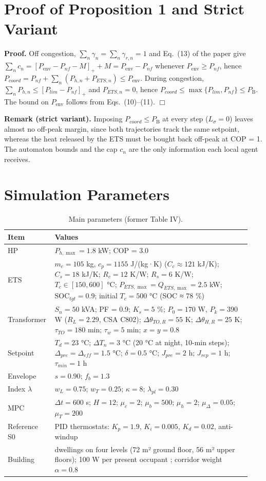 \documentclass[10pt,letterpaper]{article}
\newcommand{\Penv}{P_{\mathrm{env}}}
\newcommand{\PB}{P_{\mathrm{B}}}
\begin{document}
\section{Proof of Proposition 1 and Strict Variant}\label{s:proof}
\textbf{Proof.} Off congestion, $\sum_n\gamma_n=\sum_n\gamma_{r,n}=1$ and Eq.~(13) of the paper give
$\sum_nc_n=[\Penv-P_{nf}-M]_++M=\Penv-P_{nf}$ whenever $\Penv\ge P_{nf}$, hence $P_{coord}=P_{nf}+\sum_n(P_{h,n}+P_{ETS,n})\le\Penv$. During congestion, $\sum_nP_{h,n}\le[P_{lim}-P_{nf}]_+$ and $P_{ETS,n}=0$, hence $P_{coord}\le\max\{P_{lim},P_{nf}\}\le\PB$. The bound on $\Penv$ follows from Eqs.~(10)--(11). \hfill$\Box$

\textbf{Remark (strict variant).} Imposing $P_{coord}\le\PB$ at every step ($L_\sigma=0$) leaves almost no off-peak margin, since both trajectories track the same setpoint, whereas the heat released by the ETS must be bought back off-peak at COP = 1. The automaton bounds and the cap $c_n$ are the only information each local agent receives.

\section{Simulation Parameters}\label{s:param}
\begin{table}[h]
\centering\small
\caption{Main parameters (former Table IV).}\label{tab:s-param}
\begin{tabular}{>{\raggedright\arraybackslash}p{0.16\linewidth}>{\raggedright\arraybackslash}p{0.78\linewidth}}
\toprule
\textbf{Item} & \textbf{Values} \\
\midrule
HP & $P_{h,\max}=1.8$ kW; COP = 3.0 \\
ETS & $m_c=105$ kg, $c_p=1155$ J/(kg·K) ($C_c\approx121$ kJ/K); $C_s=18$ kJ/K; $R_c=12$ K/W; $R_s=6$ K/W; $T_c\in[150,600]$ °C; $P_{ETS,\max}=Q_{ETS,\max}=2.5$ kW; $\mathrm{SOC}_{tgt}=0.9$; initial $T_c=500$ °C (SOC ≈ 78 \%) \\
Transformer & $S_n=50$ kVA; PF = 0.9; $K_s=5$ \%; $P_0=170$ W, $P_k=390$ W ($R_L=2.29$, CSA C802); $\Delta\theta_{TO,R}=55$ K; $\Delta\theta_{H,R}=25$ K; $\tau_{TO}=180$ min; $\tau_w=5$ min; $x=y=0.8$ \\
Setpoint & $T_d=23$ °C; $\Delta T_n=3$ °C (20 °C at night, 10-min steps); $\Delta_{pre}=\Delta_{eff}=1.5$ °C; $\delta=0.5$ °C; $J_{pre}=2$ h; $J_{rep}=1$ h; $\tau_{min}=1$ h \\
Envelope & $s=0.90$; $f_b=1.3$ \\
Index $\lambda$ & $w_L=0.75$; $w_T=0.25$; $\kappa=8$; $\lambda_{pl}=0.30$ \\
MPC & $\Delta t=600$ s; $H=12$; $\mu_c=2$; $\mu_b=500$; $\mu_h=2$; $\mu_\Delta=0.05$; $\mu_T=200$ \\
Reference S0 & PID thermostats: $K_p=1.9$, $K_i=0.005$, $K_d=0.02$, anti-windup \\
Building & 16 dwellings on four levels (72 m² ground floor, 56 m² upper floors); 100 W per present occupant \cite{Richardson2008}; corridor weight $\alpha=0.8$ \\
\bottomrule
\end{tabular}
\end{table}
\end{document}
